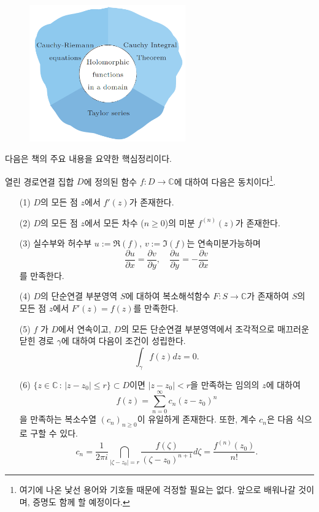 \begin{figure}[!h]
\begin{center}
\includegraphics[width=0.6\textwidth]{./SaltChapter/figs/preface-fig-0-4}
\end{center}
\end{figure}

다음은 책의 주요 내용을 요약한 핵심정리이다.

\begin{salttheorem}{}{} \label{thm-0-2}
열린 경로연결 집합 $D$에 정의된 함수
$f:D\to \mathbb C$에 대하여 다음은 
동치이다\footnote{여기에 나온 낯선 용어와 기호들 때문에 걱정할 필요는 없다.
앞으로 배워나갈 것이며, 증명도 함께 할 예정이다.}.
\begin{itemize}
\item[(1)] $D$의 모든 점 $z$에서 $f'(z)$가 존재한다.
\item[(2)] $D$의 모든 점 $z$에서 모든 차수 ($n\ge0$)의 미분  $f^{(n)}(z)$가 존재한다.
\item[(3)] 실수부와 허수부 $u:=\Re(f)$, $v:=\Im(f)$는 연속미분가능하며 
$$
\frac{\partial u}{\partial x} = \frac{\partial v}{\partial y},
\quad
\frac{\partial u}{\partial y} = - \frac{\partial v}{\partial x}
$$
를 만족한다.
\item[(4)] $D$의 단순연결 부분영역 $S$에 대하여 
복소해석함수 $ F: S\to \mathbb C$가 존재하여
$S$의 모든 점 $z$에서 $F'(z)= f(z)$를 만족한다.
\item[(5)] $ f$ 가 $D$에서 연속이고, 
$D$의 모든 단순연결 부분영역에서
조각적으로 매끄러운 닫힌 경로 $\gamma$에 대하여 다음이 조건이 성립한다.
$$
\int_\gamma f(z)dz = 0.
$$
\item[(6)] $\{ z\in \mathbb C\,:\, |z-z_0| \le r \} \subset D$이면
$|z-z_0|<r$을 만족하는 임의의 $z$에 대하여
$$
f(z) = \sum_{n=0}^\infty c_n(z-z_0)^n
$$
을 만족하는 복소수열 $(c_n)_{n\ge0}$이 유일하게 존재한다.
또한, 계수 $c_n$은 다음 식으로 구할 수 있다.
$$
c_n = \dfrac1{2\pi i} \dint_{|\zeta-z_0|=r} \frac{f(\zeta)}{(\zeta-z_0)^{n+1}}d\zeta = \dfrac{f^{(n)}(z_0)}{n!}.
$$
\end{itemize}
\end{salttheorem}

